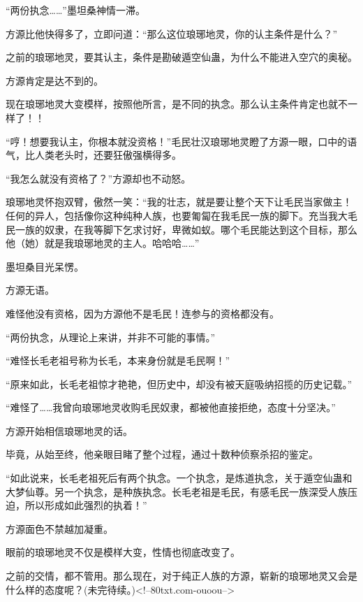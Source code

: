 \begin{this_body}
“两份执念……”墨坦桑神情一滞。

方源比他快得多了，立即问道：“那么这位琅琊地灵，你的认主条件是什么？”

之前的琅琊地灵，要其认主，条件是勘破遁空仙蛊，为什么不能进入空穴的奥秘。

方源肯定是达不到的。

现在琅琊地灵大变模样，按照他所言，是不同的执念。那么认主条件肯定也就不一样了！！

“哼！想要我认主，你根本就没资格！”毛民壮汉琅琊地灵瞪了方源一眼，口中的语气，比人类老头时，还要狂傲强横得多。

“我怎么就没有资格了？”方源却也不动怒。

琅琊地灵怀抱双臂，傲然一笑：“我的壮志，就是要让整个天下让毛民当家做主！任何的异人，包括像你这种纯种人族，也要匍匐在我毛民一族的脚下。充当我大毛民一族的奴隶，在我等脚下乞求讨好，卑微如蚁。哪个毛民能达到这个目标，那么他（她）就是我琅琊地灵的主人。哈哈哈……”

墨坦桑目光呆愣。

方源无语。

难怪他没有资格，因为方源他不是毛民！连参与的资格都没有。

“两份执念，从理论上来讲，并非不可能的事情。”

“难怪长毛老祖号称为长毛，本来身份就是毛民啊！”

“原来如此，长毛老祖惊才艳艳，但历史中，却没有被天庭吸纳招揽的历史记载。”

“难怪了……我曾向琅琊地灵收购毛民奴隶，都被他直接拒绝，态度十分坚决。”

方源开始相信琅琊地灵的话。

毕竟，从始至终，他亲眼目睹了整个过程，通过十数种侦察杀招的鉴定。

“如此说来，长毛老祖死后有两个执念。一个执念，是炼道执念，关于遁空仙蛊和大梦仙尊。另一个执念，是种族执念。长毛老祖是毛民，有感毛民一族深受人族压迫，所以形成如此强烈的执着！”

方源面色不禁越加凝重。

眼前的琅琊地灵不仅是模样大变，性情也彻底改变了。

之前的交情，都不管用。那么现在，对于纯正人族的方源，崭新的琅琊地灵又会是什么样的态度呢？(未完待续。)<!--80txt.com-ouoou-->

\end{this_body}

